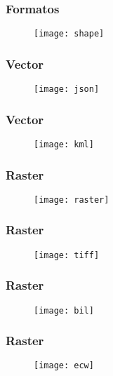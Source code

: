 \documentclass[14pt]{beamer}
\begin{document}
\begin{frame}
\frametitle{Formatos}
  \begin{figure}
    \centering
    \texttt{[image: shape]}
  \end{figure}
\end{frame}
\begin{frame}
\frametitle{Vector}
  \begin{figure}
    \centering
    \texttt{[image: json]}
  \end{figure}
\end{frame}
\begin{frame}
\frametitle{Vector}
  \begin{figure}
    \centering
    \texttt{[image: kml]}
  \end{figure}
\end{frame}
\begin{frame}
\frametitle{Raster}
  \begin{figure}
    \centering
    \texttt{[image: raster]}
  \end{figure}
\end{frame}
\begin{frame}
\frametitle{Raster}
  \begin{figure}
    \centering
    \texttt{[image: tiff]}
  \end{figure}
\end{frame}
\begin{frame}
\frametitle{Raster}
  \begin{figure}
    \centering
    \texttt{[image: bil]}
  \end{figure}
\end{frame}
\begin{frame}
\frametitle{Raster}
  \begin{figure}
    \centering
    \texttt{[image: ecw]}
  \end{figure}
\end{frame}
\end{document}
